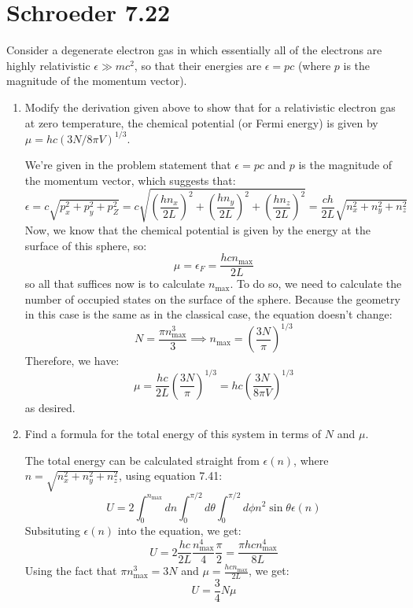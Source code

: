 \documentclass[10pt]{article}
\begin{document}
	\section*{Schroeder 7.22}
	Consider a degenerate electron gas in which essentially all of the electrons are highly relativistic 
	\( \epsilon \gg mc^2 \), so that their energies are \( \epsilon = pc \) (where \( p \) is the magnitude 
	of the momentum vector).
	\begin{enumerate}[label=\alph*)]
		\item Modify the derivation given above to show that for a relativistic electron gas at zero temperature,
			the chemical potential (or Fermi energy) is given by \( \mu = hc(3N / 8 \pi V)^{1 / 3} \).

			\begin{solution}
				We're given in the problem statement that \( \epsilon = pc \) and \( p \) is the 
				magnitude of the momentum vector, which suggests that:
				\[
				\epsilon = c\sqrt{p_x^2 + p_y^2 + p_Z^2}  = c\sqrt{\left( \frac{hn_x}{2L} \right) ^2 + 
				\left( \frac{hn_y}{2L} \right) ^2 + \left( \frac{hn_z}{2L} \right)^2} = \frac{ch}{2L}
				\sqrt{n_x^2 + n_y^2 + n_z^2} 
				\] 
				Now, we know that the chemical potential is given by the energy at the surface 
				of this sphere, so:
				\[
				\mu = \epsilon_F = \frac{hcn_{\text{max}}}{2L}
				\] 
				so all that suffices now is to calculate \( n_{\text{max}} \). To do so, we need to calculate 
				the number of occupied states on the surface of the sphere. Because the geometry 
				in this case is the same as in the classical case, the equation doesn't change: 
				\[
				N = \frac{\pi n_{\text{max}}^3}{3} \implies n_{\text{max}} = \left( \frac{3N}{\pi} \right)^{1 /3}
				\] 
				Therefore, we have:
				\[
				\mu = \frac{hc}{2L} \left( \frac{3N}{\pi} \right)^{1/3} = hc\left( \frac{3N}{8\pi V} \right)^{1 / 3}
				\] 
				as desired. 
			\end{solution}
		\item Find a formula for the total energy of this system in terms of \( N \) and \( \mu \).

			\begin{solution}
				The total energy can be calculated straight from \( \epsilon(n) \), where \( n = 
				\sqrt{n_x^2 + n_y^2 + n_z^2} \), using equation 7.41:
				\[
					U = 2 \int_0^{n_{\text{max}}} dn \int_0^{\pi /2}d \theta \int_0^{\pi / 2} d\phi n^2 
					\sin \theta \epsilon(n)
				\] 
				Subsituting \( \epsilon(n) \) into the equation, we get:
				\[
				U = 2 \frac{hc}{2L} \frac{n_{\text{max}}^4}{4} \frac{\pi}{2} = \frac{\pi h c n_{\text{max}}^4}{8L}
				\] 
				Using the fact that \( \pi n_{\text{max}}^3 = 3N \) and \( \mu = \frac{hc n_{\text{max}}}{2L} \), 
				we get: 
				\[
				U = \frac{3}{4}N \mu
				\] 
			\end{solution}
	\end{enumerate}
	\pagebreak
\end{document}
